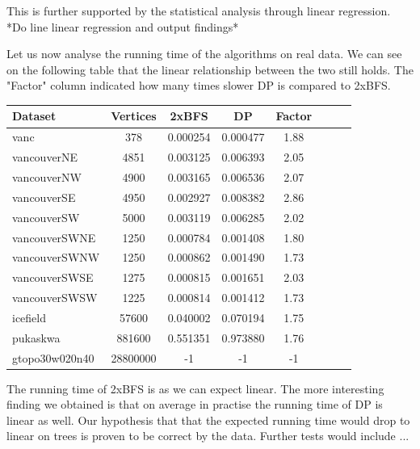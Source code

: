 This is further supported by the statistical analysis through linear regression. *Do line linear regression and output findings*

Let us now analyse the running time of the algorithms on real data. We can see on the following table that the linear relationship between the two still holds. The "Factor" column indicated how many times slower DP is compared to 2xBFS.


\begin{center}
\begin{tabular}{l*{6}{c}r}
Dataset             & Vertices          & 2xBFS          & DP            & Factor \\
\hline
vanc                & 378               & 0.000254	& 0.000477      & 1.88 \\
vancouverNE         & 4851              & 0.003125	& 0.006393      & 2.05 \\
vancouverNW         & 4900              & 0.003165	& 0.006536      & 2.07 \\
vancouverSE         & 4950              & 0.002927	& 0.008382      & 2.86 \\
vancouverSW         & 5000              & 0.003119	& 0.006285      & 2.02 \\
vancouverSWNE       & 1250              & 0.000784	& 0.001408      & 1.80 \\
vancouverSWNW       & 1250              & 0.000862	& 0.001490      & 1.73 \\
vancouverSWSE       & 1275              & 0.000815	& 0.001651      & 2.03 \\
vancouverSWSW       & 1225              & 0.000814	& 0.001412      & 1.73 \\
icefield            & 57600             & 0.040002      & 0.070194      & 1.75 \\
pukaskwa            & 881600            & 0.551351      & 0.973880      & 1.76 \\
gtopo30w020n40      & 28800000          & -1            & -1            & -1 \\

\end{tabular}
\end{center}


The running time of 2xBFS is as we can expect linear. The more interesting finding we obtained is that on average in practise the running time of DP is linear as well. Our hypothesis that that the expected running time would drop to linear on trees is proven to be correct by the data. Further tests would include ...

